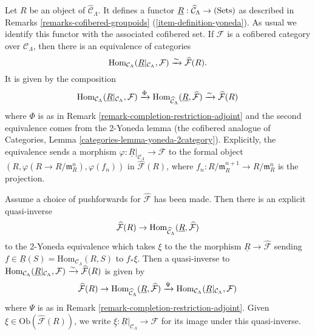 \begin{remark}
\label{remark-formal-objects-yoneda}
Let $R$ be an object of $\widehat{\mathcal C}_{\Lambda}$.  It defines a functor 
$\underline{R}: \widehat{\mathcal C}_{\Lambda} \rightarrow \textnormal{(Sets)}$ 
as described in
Remarks \ref{remarks-cofibered-groupoids} (\ref{item-definition-yoneda}).
As usual we identify this functor with the 
associated cofibered set.  If $\mathcal F$ is a cofibered category over 
$\mathcal C_{\Lambda}$, then there is an equivalence of categories
\[
\textnormal{Hom}_{\mathcal C_{\Lambda}}(\underline{R}|_{\mathcal C_{\Lambda}}, 
\mathcal F) 
\xrightarrow{\sim} 
\widehat{\mathcal F}(R).
\]
It is given by the composition
\[
\textnormal{Hom}_{\mathcal C_{\Lambda}}(\underline{R}|_{\mathcal C_{\Lambda}}, 
\mathcal F) 
\xrightarrow{\Phi} 
\textnormal{Hom}_{\widehat{\mathcal C}_{\Lambda}}(\underline{R}, 
\widehat{\mathcal F}) 
\xrightarrow{\sim}
\widehat{\mathcal F}(R)
\]
where $\Phi$ is as in Remark \ref{remark-completion-restriction-adjoint} and 
the second equivalence comes from the 2-Yoneda lemma (the cofibered analogue of 
Categories, Lemma \ref{categories-lemma-yoneda-2category}).
Explicitly, the equivalence sends a 
morphism $\varphi: \underline{R}|_{\mathcal C_{\Lambda}} \rightarrow \mathcal 
F$ to the formal object $(R, \varphi(R \rightarrow R/\mathfrak{m}_R^n), 
\varphi(f_n))$ in $\widehat{\mathcal F}(R)$, where $f_{n}: 
R/\mathfrak{m}_R^{n+1} \rightarrow R/\mathfrak{m}_{R}^{n}$ is the projection.  

\medskip \noindent
Assume a choice of pushforwards for $\widehat{\mathcal F}$ has been made.  Then 
there is an explicit quasi-inverse
\[ \widehat{\mathcal F}(R) \rightarrow \textnormal{Hom}_{\widehat{\mathcal 
C}_{\Lambda}}(\underline{R}, \widehat{\mathcal F}) \]
to the 2-Yoneda equivalence which takes $\xi$ to the the morphism 
$\underline{R} \rightarrow \widehat{\mathcal F}$ sending $f \in 
\underline{R}(S) = \text{Hom}_{\mathcal C_{\Lambda}}(R,S)$ to $f_* \xi$.  Then 
a quasi-inverse to $\textnormal{Hom}_{\mathcal 
C_{\Lambda}}(\underline{R}|_{\mathcal C_{\Lambda}}, \mathcal F) 
\xrightarrow{\sim} 
\widehat{\mathcal F}(R)$ is given by
\[
\widehat{\mathcal F}(R) 
\rightarrow 
\textnormal{Hom}_{\widehat{\mathcal C}_{\Lambda}}(\underline{R}, 
\widehat{\mathcal F})
\xrightarrow{\Psi}
\textnormal{Hom}_{\mathcal C_{\Lambda}}(\underline{R}|_{\mathcal C_{\Lambda}}, 
\mathcal F)
\]
where $\Psi$ is as in Remark \ref{remark-completion-restriction-adjoint}.  
Given $\xi \in \text{Ob}(\widehat{\mathcal F}(R))$, we write $\underline{\xi}: 
\underline{R}|_{\mathcal C_{\Lambda}} \rightarrow \mathcal F$ for its image 
under this quasi-inverse.
\end{remark}

